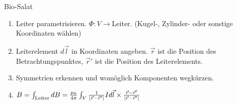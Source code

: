 

\begin{rezept}{Bio-Salat}
    \begin{enumerate}[{(}i{)}]
        \item   Leiter parametrisieren. $\Phi: V \to $Leiter. (Kugel-, Zylinder- oder sonstige Koordinaten wählen)
        \item   Leiterelement $d \vec{l}$ in Koordinaten angeben. $\vec{r}$ ist die Position des Betrachtungspunktes, $\vec{r}'$ ist die Position des Leiterelements.
        \item   Symmetrien erkennen und womöglich Komponenten wegkürzen.
        \item   $B = \int_{\text{Leiter}} d B = \frac{\mu_0}{4 \pi}\int_{V} \frac{1}{\vert\vec{r} - \vec{r}'\vert} I d \vec{l} \times \frac{\vec{r} - \vec{r}'}{\vert\vec{r} - \vec{r}'\vert}$
    \end{enumerate}
\end{rezept}


